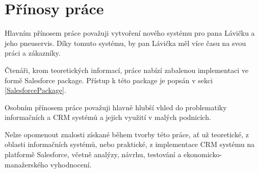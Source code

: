 \section{Přínosy práce}
Hlavním přínosem práce považuji vytvoření nového systému pro pana Lávičku a jeho pneuservis. Díky tomuto systému, by pan Lávička měl více času na svou práci a zákazníky.

Čtenáři, krom teoretických informací, práce nabízí zabalenou implementaci ve formě Salesforce package. Přístup k této package je popsán v sekci \ref{SalesforcePackage}.

Osobním přínosem práce považuji hlavně hlubší vhled do problematiky informačních a CRM systémů a jejich využití v malých podnicích. 

Nelze opomenout znalosti získané během tvorby této práce, ať už teoretické, z oblasti informačních systémů, nebo praktické, z implementace CRM systému na platformě Salesforce, včetně analýzy, návrhu, testování a ekonomicko-manažerského vyhodnocení.